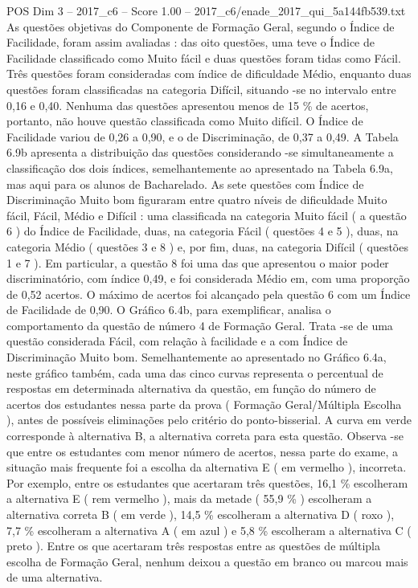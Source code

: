 \begin{textsample}{POS Dim 3 – 2017\_c6 – Score 1.00 – 2017\_c6/enade\_2017\_qui\_5a144fb539.txt}
As questões objetivas do Componente de Formação Geral, segundo o Índice de Facilidade, foram assim avaliadas : das oito questões, uma teve o Índice de Facilidade classificado como Muito fácil e duas questões foram tidas como Fácil.
Três questões foram consideradas com índice de dificuldade Médio, enquanto duas questões foram classificadas na categoria Difícil, situando -se no intervalo entre 0,16 e 0,40.
Nenhuma das questões apresentou menos de 15 \% de acertos, portanto, não houve questão classificada como Muito difícil.
O Índice de Facilidade variou de 0,26 a 0,90, e o de Discriminação, de 0,37 a 0,49.
A Tabela 6.9b apresenta a distribuição das questões considerando -se simultaneamente a classificação dos dois índices, semelhantemente ao apresentado na Tabela 6.9a, mas aqui para os alunos de Bacharelado.
As sete questões com Índice de Discriminação Muito bom figuraram entre quatro níveis de dificuldade Muito fácil, Fácil, Médio e Difícil : uma classificada na categoria Muito fácil ( a questão 6 ) do Índice de Facilidade, duas, na categoria Fácil ( questões 4 e 5 ), duas, na categoria Médio ( questões 3 e 8 ) e, por fim, duas, na categoria Difícil ( questões 1 e 7 ).
Em particular, a questão 8 foi uma das que apresentou o maior poder discriminatório, com índice 0,49, e foi considerada Médio em, com uma proporção de 0,52 acertos.
O máximo de acertos foi alcançado pela questão 6 com um Índice de Facilidade de 0,90.
O Gráfico 6.4b, para exemplificar, analisa o comportamento da questão de número 4 de Formação Geral.
Trata -se de uma questão considerada Fácil, com relação à facilidade e a com Índice de Discriminação Muito bom.
Semelhantemente ao apresentado no Gráfico 6.4a, neste gráfico também, cada uma das cinco curvas representa o percentual de respostas em determinada alternativa da questão, em função do número de acertos dos estudantes nessa parte da prova ( Formação Geral/Múltipla Escolha ), antes de possíveis eliminações pelo critério do ponto-bisserial.
A curva em verde corresponde à alternativa B, a alternativa correta para esta questão.
Observa -se que entre os estudantes com menor número de acertos, nessa parte do exame, a situação mais frequente foi a escolha da alternativa E ( em vermelho ), incorreta.
Por exemplo, entre os estudantes que acertaram três questões, 16,1 \% escolheram a alternativa E ( rem vermelho ), mais da metade ( 55,9 \% ) escolheram a alternativa correta B ( em verde ), 14,5 \% escolheram a alternativa D ( roxo ), 7,7 \% escolheram a alternativa A ( em azul ) e 5,8 \% escolheram a alternativa C ( preto ).
Entre os que acertaram três respostas entre as questões de múltipla escolha de Formação Geral, nenhum deixou a questão em branco ou marcou mais de uma alternativa.

\end{textsample}
